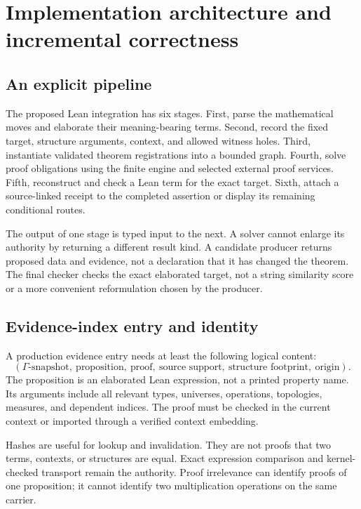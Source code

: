 \documentclass[11pt,a4paper]{article}
\theoremstyle{plain}
\theoremstyle{definition}
\theoremstyle{remark}
\begin{document}
\section{Implementation architecture and incremental correctness}\label{sec:implementation}

\subsection{An explicit pipeline}
The proposed Lean integration has six stages. First, parse the mathematical moves and elaborate their meaning-bearing terms. Second, record the fixed target, structure arguments, context, and allowed witness holes. Third, instantiate validated theorem registrations into a bounded graph. Fourth, solve proof obligations using the finite engine and selected external proof services. Fifth, reconstruct and check a Lean term for the exact target. Sixth, attach a source-linked receipt to the completed assertion or display its remaining conditional routes.

The output of one stage is typed input to the next. A solver cannot enlarge its authority by returning a different result kind. A candidate producer returns proposed data and evidence, not a declaration that it has changed the theorem. The final checker checks the exact elaborated target, not a string similarity score or a more convenient reformulation chosen by the producer.

\subsection{Evidence-index entry and identity}
A production evidence entry needs at least the following logical content:
\[
 (\Gamma\text{-snapshot},\ \text{proposition},\ \text{proof},\
   \text{source support},\ \text{structure footprint},\ \text{origin}).
\]
The proposition is an elaborated Lean expression, not a printed property name. Its arguments include all relevant types, universes, operations, topologies, measures, and dependent indices. The proof must be checked in the current context or imported through a verified context embedding.

Hashes are useful for lookup and invalidation. They are not proofs that two terms, contexts, or structures are equal. Exact expression comparison and kernel-checked transport remain the authority. Proof irrelevance can identify proofs of one proposition; it cannot identify two multiplication operations on the same carrier.
\end{document}
